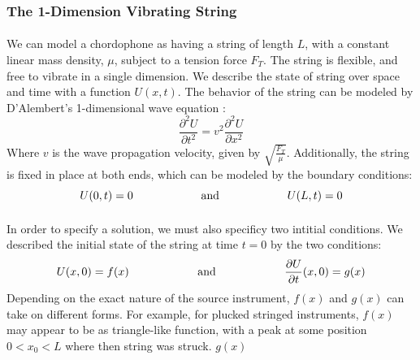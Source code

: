 \documentclass[12pt,letterpaper]{article}
\begin{document}
\subsubsection{The 1-Dimension Vibrating String}

\paragraph*{}We can model a chordophone as having a string of length $L$, with a constant linear mass density, $\mu$, subject to a tension force $F_T$. The string is flexible, and free to vibrate in a single dimension. We describe the state of string over space and time with a function $U(x,t)$. The behavior of the string can be  modeled by D'Alembert's 1-dimensional wave equation \cite{Haberman,Taylor}:
\begin{equation}
\label{eqn-1DWaveEqn}
\frac{\partial^2 U}{\partial t^2} = v^2 \frac{\partial^2 U}{\partial x^2}
\end{equation}
Where $v$ is the wave propagation velocity, given by $\sqrt{\frac{F_T}{\mu}}$. Additionally, the string is fixed in place at both ends, which can be modeled by the boundary conditions:
\begin{equation}
U(0,t) = 0 
	\text{\hspace*{2cm} and \hspace*{2cm}}
U(L,t) = 0 
\end{equation}

\paragraph*{}In order to specify a solution, we must also specificy two intitial conditions. We described the initial state of the string at time $t = 0$  by the two conditions:
\begin{equation}
U(x,0) = f(x) 
	\text{\hspace*{2cm} and \hspace*{2cm}}
\frac{\partial U}{\partial t}(x,0) = g(x)
\end{equation}
Depending on the exact nature of the source instrument, $f(x)$ and $g(x)$ can take on different forms. For example, for plucked stringed instruments, $f(x)$ may appear to be as triangle-like function, with a peak at some position $0 < x_0 < L$ where then string was struck. $g(x)$
\end{document}
